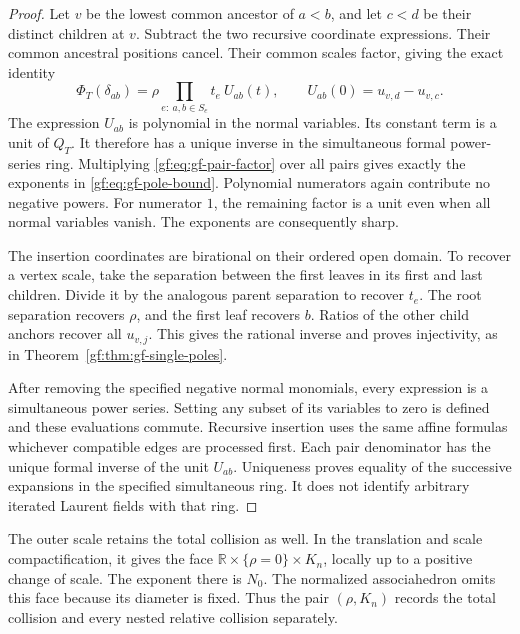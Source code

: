 \begin{proof}
Let \(v\) be the lowest common ancestor of \(a<b\), and
let \(c<d\) be their distinct children at \(v\).
Subtract the two recursive coordinate expressions.
Their common ancestral positions cancel.  Their common scales factor,
giving the exact identity
\begin{equation}\label{gf:eq:gf-pair-factor}
 \Phi_T(\delta_{ab})=
 \rho\prod_{e:\ a,b\in S_e}t_e\ U_{ab}(t),
 \qquad U_{ab}(0)=u_{v,d}-u_{v,c}.
\end{equation}
The expression \(U_{ab}\) is polynomial in the normal variables.
Its constant term is a unit of \(Q_T\).
It therefore has a unique inverse in the simultaneous formal
power-series ring.  Multiplying \eqref{gf:eq:gf-pair-factor} over
all pairs gives exactly the exponents in
\eqref{gf:eq:gf-pole-bound}.  Polynomial numerators again contribute
no negative powers.  For numerator \(1\), the remaining factor
is a unit even when all normal variables vanish.  The exponents
are consequently sharp.

The insertion coordinates are birational on their ordered open
domain.  To recover a vertex scale, take the separation between
the first leaves in its first and last children.  Divide it by
the analogous parent separation to recover \(t_e\).
The root separation recovers \(\rho\), and the first leaf
recovers \(b\).  Ratios of the other child anchors recover
all \(u_{v,j}\).  This gives the rational inverse and proves
injectivity, as in Theorem~\ref{gf:thm:gf-single-poles}.

After removing the specified negative normal monomials, every
expression is a simultaneous power series.  Setting any subset
of its variables to zero is defined and these evaluations commute.
Recursive insertion uses the same affine formulas whichever
compatible edges are processed first.  Each pair denominator has
the unique formal inverse of the unit \(U_{ab}\).
Uniqueness proves equality of the successive expansions in the
specified simultaneous ring.  It does not identify arbitrary
iterated Laurent fields with that ring.
\end{proof}

The outer scale retains the total collision as well.  In the
translation and scale compactification, it gives the face
\(\mathbb R\times\{\rho=0\}\times K_n\), locally up to a
positive change of scale.  The exponent there is \(N_0\).
The normalized associahedron omits this face because its diameter
is fixed.  Thus the pair \((\rho,K_n)\) records the total
collision and every nested relative collision separately.


